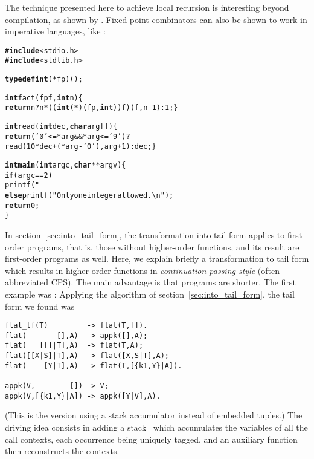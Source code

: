 The technique presented here to achieve local recursion is interesting
beyond compilation, as shown
by \cite{GoldbergWiener_2009}. Fixed\hyp{}point combinators can also
be shown to work in imperative languages, like \Clang:
\begin{alltt}
\textbf{#include}<stdio.h>
\textbf{#include}<stdlib.h>

\textbf{typedef int} (*fp)();

\textbf{int} fact(fp f, \textbf{int} n) \{
  \textbf{return} n? n * ((\textbf{int} (*)(fp,\textbf{int}))f)(f,n-1) : 1; \}

\textbf{int} read(\textbf{int} dec, \textbf{char} arg[]) \{
  \textbf{return} ('0' <= *arg && *arg <= '9')? 
         read(10*dec+(*arg - '0'),arg+1) : dec; \}

\textbf{int main}(\textbf{int} argc, \textbf{char}** argv) \{
  \textbf{if} (argc == 2) 
     printf("%u\textbackslash{n}",fact(&fact,read(0,argv[1])));
  \textbf{else} printf("Only one integer allowed.\textbackslash{n}");
  \textbf{return} 0;
\}
\end{alltt}


In section~\ref{sec:into_tail_form}, the transformation into tail form
applies to first\hyp{}order programs, that is, those without
higher\hyp{}order functions, and its result are first\hyp{}order
programs as well. Here, we explain briefly a transformation to tail
form which results in higher\hyp{}order functions in
\emph{continuation\hyp{}passing style}
(often abbreviated CPS). The main advantage is that programs are
shorter. The first example was :
 Applying the algorithm of
section~\ref{sec:into_tail_form}, the tail form we found was
\begin{verbatim}
flat_tf(T)         -> flat(T,[]).
flat(       [],A)  -> appk([],A);
flat(   [[]|T],A)  -> flat(T,A);
flat([[X|S]|T],A)  -> flat([X,S|T],A);
flat(    [Y|T],A)  -> flat(T,[{k1,Y}|A]).

appk(V,        []) -> V;
appk(V,[{k1,Y}|A]) -> appk([Y|V],A).
\end{verbatim}
(This is the version using a stack accumulator instead of embedded
tuples.) The driving idea consists in adding a stack~ which
accumulates the variables of all the call contexts, each occurrence
being uniquely tagged, and an auxiliary function  then
reconstructs the contexts. 

